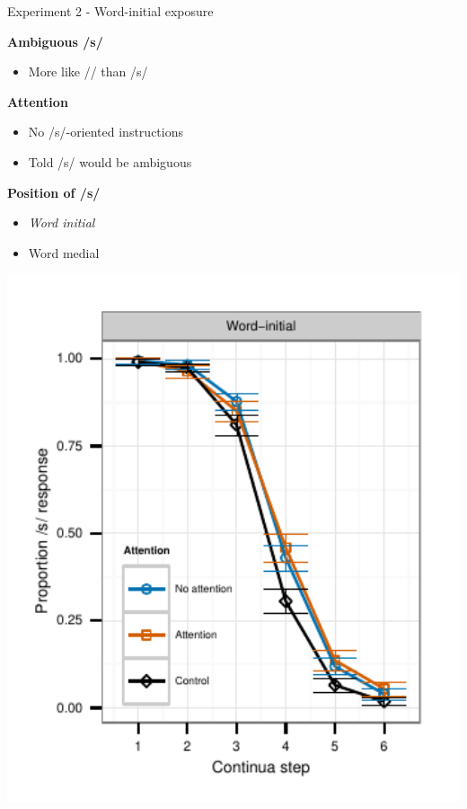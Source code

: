 \documentclass{beamer}
\begin{document}
\begin{frame}{Experiment 2 - Word-initial exposure}

\begin{minipage}{0.4\textwidth}
\textbf{Ambiguous /s/}
\begin{itemize}
\item More like /\textesh/ than /s/
\end{itemize}

\textbf{Attention}
\begin{itemize}
\item No /s/-oriented instructions
\item Told /s/ would be ambiguous
\end{itemize}

\textbf{Position of /s/}
\begin{itemize}
\item \emph{Word initial}
\item Word medial
\end{itemize}
\end{minipage}
\hfill
\begin{minipage}{0.53\textwidth}
\includegraphics[width=1.0\textwidth]{graphs/exp2_categresults_present2-initial}
\end{minipage}

\end{frame}
\end{document}
